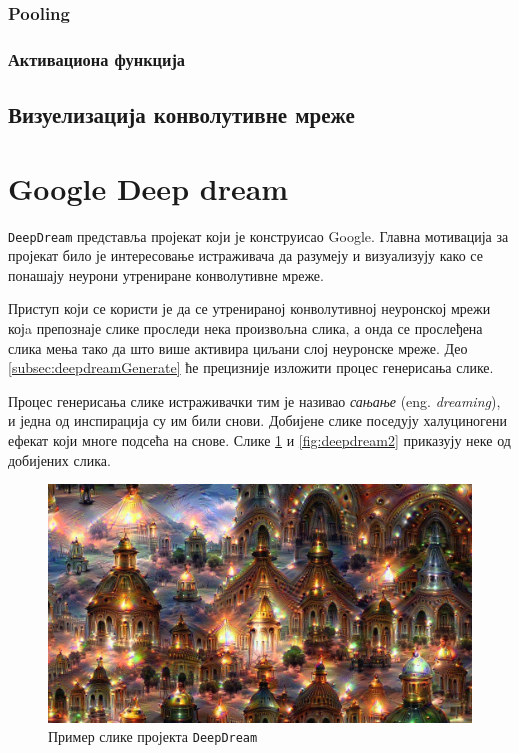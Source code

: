 \documentclass[a4paper]{article}
\begin{document}
\subsubsection{Pooling}
\subsubsection{Активациона функција}

\subsection{Визуелизација конволутивне мреже}

\section{Google Deep dream}
\texttt{DeepDream} представља пројекат који је конструисао Google. Главна мотивација за пројекат било је
интересовање истраживача да разумеју и визуализују како се понашају неурони утрениране конволутивне
мреже. 

Приступ који се користи је да се утренираној конволутивној неуронској мрежи којa препознаје слике
проследи нека произвољна слика, а онда се прослеђена слика мења тако да што више активира циљани
слој неуронске мреже. Део \ref{subsec:deepdreamGenerate} ће прецизније изложити процес генерисања слике.

Процес генерисања слике истраживачки тим је називао \textit{сањање} (eng. \textit{dreaming}),
и једна од инспирација су им били снови. Добијене слике поседују халуциногени ефекат који
многе подсећа на снове. Слике \ref{fig:deepdream1} и \ref{fig:deepdream2} приказују неке од добијених слика.

\begin{figure}[h!]
\begin{center}
    \includegraphics[width=\textwidth]{./resources/deepdream1.jpg}
\end{center}
\caption{Пример слике пројекта \texttt{DeepDream}}
\label{fig:deepdream1}
\end{figure}
\end{document}

